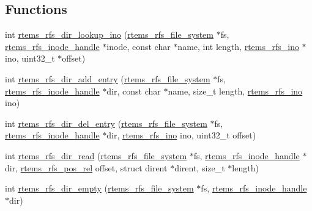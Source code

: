 \subsection*{Functions}
\begin{DoxyCompactItemize}
\item 
int \mbox{\hyperlink{rtems-rfs-dir_8h_a925d23dfc36f8f42bdb373855f94c226}{rtems\+\_\+rfs\+\_\+dir\+\_\+lookup\+\_\+ino}} (\mbox{\hyperlink{struct__rtems__rfs__file__system}{rtems\+\_\+rfs\+\_\+file\+\_\+system}} $\ast$fs, \mbox{\hyperlink{rtems-rfs-inode_8h_a91f02dac5a2d91e072d676f3266ab8d2}{rtems\+\_\+rfs\+\_\+inode\+\_\+handle}} $\ast$inode, const char $\ast$name, int length, \mbox{\hyperlink{rtems-rfs-inode_8h_ae658325c3ff9941f2e68315d20e3c723}{rtems\+\_\+rfs\+\_\+ino}} $\ast$ino, uint32\+\_\+t $\ast$offset)
\item 
int \mbox{\hyperlink{rtems-rfs-dir_8h_a8b0d72704a836e92be9211cd27b50aab}{rtems\+\_\+rfs\+\_\+dir\+\_\+add\+\_\+entry}} (\mbox{\hyperlink{struct__rtems__rfs__file__system}{rtems\+\_\+rfs\+\_\+file\+\_\+system}} $\ast$fs, \mbox{\hyperlink{rtems-rfs-inode_8h_a91f02dac5a2d91e072d676f3266ab8d2}{rtems\+\_\+rfs\+\_\+inode\+\_\+handle}} $\ast$dir, const char $\ast$name, size\+\_\+t length, \mbox{\hyperlink{rtems-rfs-inode_8h_ae658325c3ff9941f2e68315d20e3c723}{rtems\+\_\+rfs\+\_\+ino}} ino)
\item 
int \mbox{\hyperlink{rtems-rfs-dir_8h_a50190aa71ba1a3d42d0dcd2b37095c5f}{rtems\+\_\+rfs\+\_\+dir\+\_\+del\+\_\+entry}} (\mbox{\hyperlink{struct__rtems__rfs__file__system}{rtems\+\_\+rfs\+\_\+file\+\_\+system}} $\ast$fs, \mbox{\hyperlink{rtems-rfs-inode_8h_a91f02dac5a2d91e072d676f3266ab8d2}{rtems\+\_\+rfs\+\_\+inode\+\_\+handle}} $\ast$dir, \mbox{\hyperlink{rtems-rfs-inode_8h_ae658325c3ff9941f2e68315d20e3c723}{rtems\+\_\+rfs\+\_\+ino}} ino, uint32\+\_\+t offset)
\item 
int \mbox{\hyperlink{rtems-rfs-dir_8h_a3487727e61e23fc3c551cc6cc49115f1}{rtems\+\_\+rfs\+\_\+dir\+\_\+read}} (\mbox{\hyperlink{struct__rtems__rfs__file__system}{rtems\+\_\+rfs\+\_\+file\+\_\+system}} $\ast$fs, \mbox{\hyperlink{rtems-rfs-inode_8h_a91f02dac5a2d91e072d676f3266ab8d2}{rtems\+\_\+rfs\+\_\+inode\+\_\+handle}} $\ast$dir, \mbox{\hyperlink{rtems-rfs-file-system_8h_af6bccb465dcd34c68e9f0c214950ef57}{rtems\+\_\+rfs\+\_\+pos\+\_\+rel}} offset, struct dirent $\ast$dirent, size\+\_\+t $\ast$length)
\item 
int \mbox{\hyperlink{rtems-rfs-dir_8h_a8347f100a80fdbfb9ba8bcb3aff40a38}{rtems\+\_\+rfs\+\_\+dir\+\_\+empty}} (\mbox{\hyperlink{struct__rtems__rfs__file__system}{rtems\+\_\+rfs\+\_\+file\+\_\+system}} $\ast$fs, \mbox{\hyperlink{rtems-rfs-inode_8h_a91f02dac5a2d91e072d676f3266ab8d2}{rtems\+\_\+rfs\+\_\+inode\+\_\+handle}} $\ast$dir)
\end{DoxyCompactItemize}


